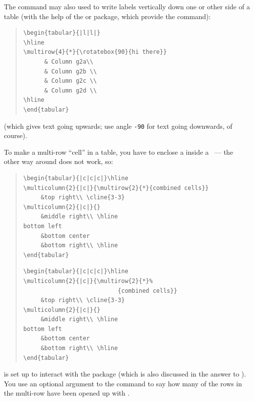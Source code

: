 The  command may also used to write labels vertically
down one or other side of a table (with the help of the
 or  package, which provide the
 command):
\begin{quote}
\begin{verbatim}
\begin{tabular}{|l|l|}
\hline
\multirow{4}{*}{\rotatebox{90}{hi there}}
      & Column g2a\\
      & Column g2b \\
      & Column g2c \\
      & Column g2d \\
\hline
\end{tabular}
\end{verbatim}
\end{quote}
(which gives text going upwards; use angle \texttt{-90} for text going
downwards, of course).

To make a  multi-row ``cell'' in a table, you have to
enclose a  inside a ~--- the other way
around does not work, so:
\begin{quote}
\begin{wideversion}
\begin{verbatim}
\begin{tabular}{|c|c|c|}\hline
\multicolumn{2}{|c|}{\multirow{2}{*}{combined cells}}
     &top right\\ \cline{3-3}
\multicolumn{2}{|c|}{}
     &middle right\\ \hline
bottom left
     &bottom center
     &bottom right\\ \hline
\end{tabular}
\end{verbatim}
\end{wideversion}
\begin{narrowversion}
\begin{verbatim}
\begin{tabular}{|c|c|c|}\hline
\multicolumn{2}{|c|}{\multirow{2}{*}%
                           {combined cells}}
     &top right\\ \cline{3-3}
\multicolumn{2}{|c|}{}
     &middle right\\ \hline
bottom left
     &bottom center
     &bottom right\\ \hline
\end{tabular}
\end{verbatim}
\end{narrowversion}
\end{quote}
 is set up to interact with the 
package (which is also discussed in the answer to %
).  You use an
optional argument to the  command to say how many of the
rows in the multi-row have been opened up with .

